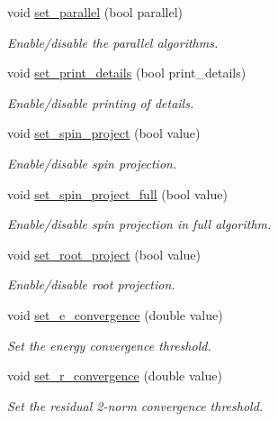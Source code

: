 \begin{DoxyCompactItemize}
void \mbox{\hyperlink{classforte_1_1_sparse_c_i_solver_aa8dd7b7d1055bd7a4da4f6d8142f3e30}{set\+\_\+parallel}} (bool parallel)
\begin{DoxyCompactList}\small\item\em Enable/disable the parallel algorithms. \end{DoxyCompactList}\item 
void \mbox{\hyperlink{classforte_1_1_sparse_c_i_solver_a2519c690bc3358ae5044751f82883ec5}{set\+\_\+print\+\_\+details}} (bool print\+\_\+details)
\begin{DoxyCompactList}\small\item\em Enable/disable printing of details. \end{DoxyCompactList}\item 
void \mbox{\hyperlink{classforte_1_1_sparse_c_i_solver_acd0811057b8700a32534f7b7b2dd1f6c}{set\+\_\+spin\+\_\+project}} (bool value)
\begin{DoxyCompactList}\small\item\em Enable/disable spin projection. \end{DoxyCompactList}\item 
void \mbox{\hyperlink{classforte_1_1_sparse_c_i_solver_a9aebb57a279e852c9958fa5252f55b88}{set\+\_\+spin\+\_\+project\+\_\+full}} (bool value)
\begin{DoxyCompactList}\small\item\em Enable/disable spin projection in full algorithm. \end{DoxyCompactList}\item 
void \mbox{\hyperlink{classforte_1_1_sparse_c_i_solver_a57d0f61f1dd1102d3b53202b70848ac5}{set\+\_\+root\+\_\+project}} (bool value)
\begin{DoxyCompactList}\small\item\em Enable/disable root projection. \end{DoxyCompactList}\item 
void \mbox{\hyperlink{classforte_1_1_sparse_c_i_solver_a06e02001769ec8e69c48a0c52a36c979}{set\+\_\+e\+\_\+convergence}} (double value)
\begin{DoxyCompactList}\small\item\em Set the energy convergence threshold. \end{DoxyCompactList}\item 
void \mbox{\hyperlink{classforte_1_1_sparse_c_i_solver_a4851fbd54a168a4e3ff1e278790bea59}{set\+\_\+r\+\_\+convergence}} (double value)
\begin{DoxyCompactList}\small\item\em Set the residual 2-\/norm convergence threshold. \end{DoxyCompactList}\item 

\end{DoxyCompactItemize}
